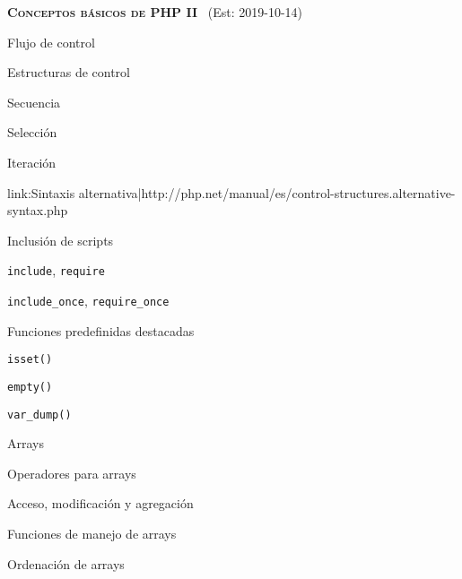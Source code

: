 \begin{longenum}
\begin{longenum}
\begin{longenum}
        \end{longenum}
    \end{longenum}
    \item \textbf{\textsc{Conceptos básicos de PHP II}} \ (Est: 2019-10-14)
    \begin{longenum}
        \item Flujo de control
        \begin{longenum}
            \item Estructuras de control
            \begin{longenum}
                \item Secuencia
                \item Selección
                \item Iteración
                \item [link:Sintaxis alternativa|http://php.net/manual/es/control-structures.alternative-syntax.php]
            \end{longenum}
            \item Inclusión de scripts
            \begin{longenum}
                \item \texttt{include}, \texttt{require}
                \item \texttt{include\_once}, \texttt{require\_once}
            \end{longenum}
        \end{longenum}
        \item Funciones predefinidas destacadas
        \begin{longenum}
            \item \texttt{isset()}
            \item \texttt{empty()}
            \item \texttt{var\_dump()}
        \end{longenum}
        \item Arrays
        \begin{longenum}
            \item Operadores para arrays
            \begin{longenum}
                \item Acceso, modificación y agregación
            \end{longenum}
            \item Funciones de manejo de arrays
            \begin{longenum}
                \item Ordenación de arrays

\end{longenum}
\end{longenum}
\end{longenum}
\end{longenum}

